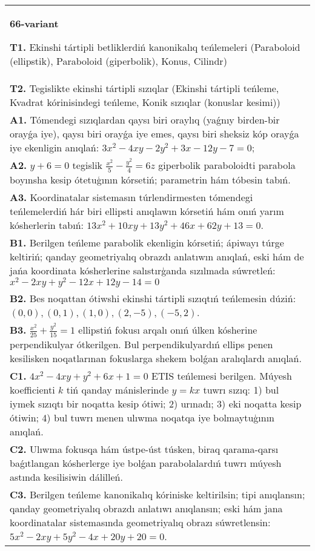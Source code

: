 \documentclass{article}
\begin{document}
\begin{tabular}{m{17cm}}
\textbf{66-variant}
\newline

\textbf{T1.} Ekinshi tártipli betliklerdiń kanonikalıq teńlemeleri (Paraboloid (ellipstik), Paraboloid (giperbolik), Konus, Cilindr) \\
\textbf{T2.} Tegislikte ekinshi tártipli sızıqlar (Ekinshi tártipli teńleme, Kvadrat kórinisindegi teńleme, Konik sızıqlar (konuslar kesimi)) \\
\textbf{A1.} Tómendegi sızıqlardan qaysı biri oraylıq (yaǵnıy birden-bir orayǵa iye), qaysı biri orayǵa iye emes, qaysı biri sheksiz kóp orayǵa iye ekenligin anıqlań: $3 x^2-4 x y-2 y^2+3 x-12 y-7=0$; \\
\textbf{A2.} $y+6=0$ tegislik $\frac{x^2}{5}-\frac{y^2}{4}=6 z$ giperbolik paraboloidti parabola boyınsha kesip ótetuģının kórsetiń; parametrin hám tóbesin tabıń. \\
\textbf{A3.} Koordinatalar sistemasın túrlendirmesten tómendegi teńlemelerdiń hár biri ellipsti anıqlawın kórsetiń hám onıń yarım kósherlerin tabıń: $13 x^2+10 x y+13 y^2+46 x+62 y+13=0$. \\
\textbf{B1.} Berilgen teńleme parabolik ekenligin kórsetiń; ápiwayı túrge keltiriń; qanday geometriyalıq obrazdı anlatıwın anıqlań, eski hám de jańa koordinata kósherlerine salıstırģanda sızılmada súwretleń: $x^2-2 x y+y^2-12 x+12 y-14=0$ \\
\textbf{B2.} Bes noqattan ótiwshi ekinshi tártipli sızıqtıń teńlemesin dúziń: $(0,0),(0,1),(1,0),(2,-5),(-5,2)$. \\
\textbf{B3.} $\frac{x^2}{25}+\frac{y^2}{15}=1$ ellipstiń fokusı arqalı onıń úlken kósherine perpendikulyar ótkerilgen. Bul perpendikulyardıń ellips penen kesilisken noqatlarınan fokuslarga shekem bolǵan aralıqlardı anıqlań. \\
\textbf{C1.} $4 x^2-4 x y+y^2+6 x+1=0$ ETIS teńlemesi berilgen. Múyesh koefficienti $k$ tiń qanday mánislerinde $y=kx$ tuwrı sızıq: 1) bul iymek sızıqtı bir noqatta kesip ótiwi; 2) urınadı; 3) eki noqatta kesip ótiwin; 4) bul tuwrı menen ulıwma noqatqa iye bolmaytuģının anıqlań. \\
\textbf{C2.} Ulıwma fokusqa hám ústpe-úst túsken, biraq qarama-qarsı baǵıtlangan kósherlerge iye bolǵan parabolalardıń tuwrı múyesh astında kesilisiwin dálilleń. \\
\textbf{C3.} Berilgen teńleme kanonikalıq kóriniske keltirilsin; tipi anıqlansın; qanday geometriyalıq obrazdı anlatıwı anıqlansın; eski hám jana koordinatalar sistemasında geometriyalıq obrazı súwretlensin: $5 x^2-2 x y+5 y^2-4 x+20 y+20=0$. \\

\end{tabular}
\vspace{1cm}
\end{document}
